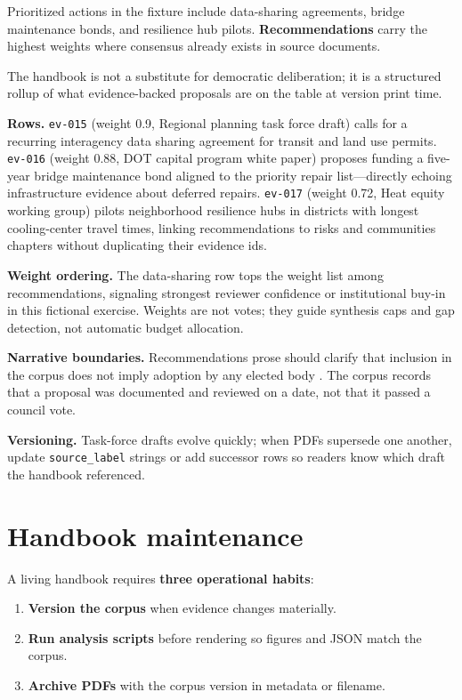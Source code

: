 \documentclass[
]{article}
\providecommand{\tightlist}{%
  \setlength{\itemsep}{0pt}\setlength{\parskip}{0pt}}
\begin{document}
Prioritized actions in the fixture include data-sharing agreements,
bridge maintenance bonds, and resilience hub pilots.
\textbf{Recommendations} carry the highest weights where consensus
already exists in source documents.

The handbook is not a substitute for democratic deliberation; it is a
structured rollup of what evidence-backed proposals are on the table at
version print time.

\textbf{Rows.} \texttt{ev-015} (weight 0.9, Regional planning task force
draft) calls for a recurring interagency data sharing agreement for
transit and land use permits. \texttt{ev-016} (weight 0.88, DOT capital
program white paper) proposes funding a five-year bridge maintenance
bond aligned to the priority repair list---directly echoing
infrastructure evidence about deferred repairs. \texttt{ev-017} (weight
0.72, Heat equity working group) pilots neighborhood resilience hubs in
districts with longest cooling-center travel times, linking
recommendations to risks and communities chapters without duplicating
their evidence ids.

\textbf{Weight ordering.} The data-sharing row tops the weight list
among recommendations, signaling strongest reviewer confidence or
institutional buy-in in this fictional exercise. Weights are not votes;
they guide synthesis caps and gap detection, not automatic budget
allocation.

\textbf{Narrative boundaries.} Recommendations prose should clarify that
inclusion in the corpus does not imply adoption by any elected body
\citep{bowker2005}. The corpus records that a proposal was documented
and reviewed on a date, not that it passed a council vote.

\textbf{Versioning.} Task-force drafts evolve quickly; when PDFs
supersede one another, update \texttt{source\_label} strings or add
successor rows so readers know which draft the handbook referenced.

\newpage

\section{Handbook maintenance}\label{handbook-maintenance}

A living handbook requires \textbf{three operational habits}:

\begin{enumerate}
\def\labelenumi{\arabic{enumi}.}
\tightlist
\item
  \textbf{Version the corpus} when evidence changes materially.
\item
  \textbf{Run analysis scripts} before rendering so figures and JSON
  match the corpus.
\item
  \textbf{Archive PDFs} with the corpus version in metadata or filename.
\end{enumerate}
\end{document}
